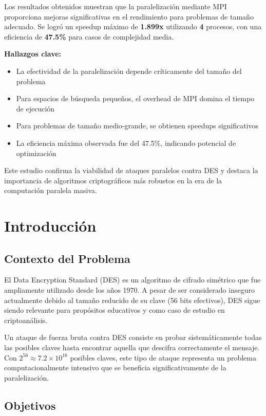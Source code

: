 \documentclass[12pt,letterpaper]{article}
\begin{document}
Los resultados obtenidos muestran que la paralelización mediante MPI proporciona mejoras significativas en el rendimiento para problemas de tamaño adecuado. Se logró un speedup máximo de \textbf{1.899x} utilizando \textbf{4} procesos, con una eficiencia de \textbf{47.5\%} para casos de complejidad media.

\textbf{Hallazgos clave:}
\begin{itemize}
    \item La efectividad de la paralelización depende críticamente del tamaño del problema
    \item Para espacios de búsqueda pequeños, el overhead de MPI domina el tiempo de ejecución
    \item Para problemas de tamaño medio-grande, se obtienen speedups significativos
    \item La eficiencia máxima observada fue del 47.5\%, indicando potencial de optimización
\end{itemize}

Este estudio confirma la viabilidad de ataques paralelos contra DES y destaca la importancia de algoritmos criptográficos más robustos en la era de la computación paralela masiva.

\section{Introducción}

\subsection{Contexto del Problema}

El Data Encryption Standard (DES) es un algoritmo de cifrado simétrico que fue ampliamente utilizado desde los años 1970. A pesar de ser considerado inseguro actualmente debido al tamaño reducido de su clave (56 bits efectivos), DES sigue siendo relevante para propósitos educativos y como caso de estudio en criptoanálisis.

Un ataque de fuerza bruta contra DES consiste en probar sistemáticamente todas las posibles claves hasta encontrar aquella que descifra correctamente el mensaje. Con $2^{56} \approx 7.2 \times 10^{16}$ posibles claves, este tipo de ataque representa un problema computacionalmente intensivo que se beneficia significativamente de la paralelización.

\subsection{Objetivos}
\end{document}
